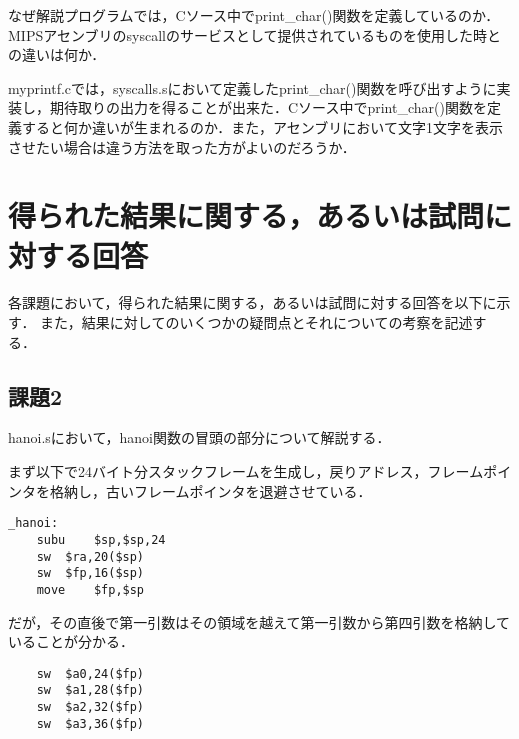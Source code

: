 \documentclass[a4j]{jarticle}
\begin{document}
なぜ解説プログラムでは，Cソース中でprint\_char()関数を定義しているのか．MIPSアセンブリのsyscallのサービスとして提供されているものを使用した時との違いは何か．

myprintf.cでは，syscalls.sにおいて定義したprint\_char()関数を呼び出すように実装し，期待取りの出力を得ることが出来た．Cソース中でprint\_char()関数を定義すると何か違いが生まれるのか．また，アセンブリにおいて文字1文字を表示させたい場合は違う方法を取った方がよいのだろうか．




%
%

\section{得られた結果に関する，あるいは試問に対する回答}


各課題において，得られた結果に関する，あるいは試問に対する回答を以下に示す．
また，結果に対してのいくつかの疑問点とそれについての考察を記述する．



\subsection{課題2}


hanoi.sにおいて，hanoi関数の冒頭の部分について解説する．

まず以下で24バイト分スタックフレームを生成し，戻りアドレス，フレームポインタを格納し，古いフレームポインタを退避させている．

\begin{verbatim} 
_hanoi:
	subu	$sp,$sp,24
	sw	$ra,20($sp)
	sw	$fp,16($sp)
	move	$fp,$sp
\end{verbatim}

だが，その直後で第一引数はその領域を越えて第一引数から第四引数を格納していることが分かる．

\begin{verbatim} 
	sw	$a0,24($fp)
	sw	$a1,28($fp)
	sw	$a2,32($fp)
	sw	$a3,36($fp)
\end{verbatim} 
\end{document}

